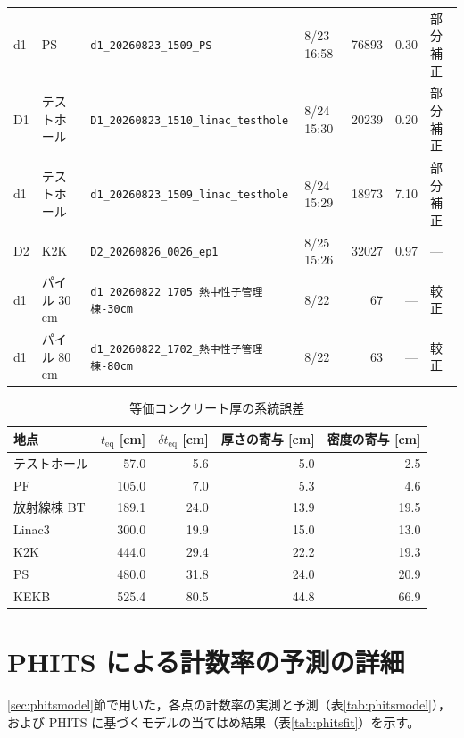 \documentclass[a4paper,11pt]{ltjsarticle}
\newcommand{\teq}{t_{\mathrm{eq}}}
\begin{document}
\begin{table}[htbp]
\begin{tabular}{llllrrl}
    d1 & PS & \texttt{d1\_20260823\_1509\_PS} & 8/23 16:58 & 76893 & 0.30 & 部分補正 \\
    D1 & テストホール & \texttt{D1\_20260823\_1510\_linac\_testhole} & 8/24 15:30 & 20239 & 0.20 & 部分補正 \\
    d1 & テストホール & \texttt{d1\_20260823\_1509\_linac\_testhole} & 8/24 15:29 & 18973 & 7.10 & 部分補正 \\
    D2 & K2K & \texttt{D2\_20260826\_0026\_ep1} & 8/25 15:26 & 32027 & 0.97 & --- \\
    \midrule
    d1 & パイル 30\,cm & \texttt{d1\_20260822\_1705\_熱中性子管理棟-30cm} & 8/22 & 67 & --- & 較正 \\
    d1 & パイル 80\,cm & \texttt{d1\_20260822\_1702\_熱中性子管理棟-80cm} & 8/22 & 63 & --- & 較正 \\
    \bottomrule
  \end{tabular}
\end{table}

\begin{table}[htbp]
  \centering
  \caption{等価コンクリート厚の系統誤差}
  \label{tab:teqerr}
  \begin{tabular}{lrrrr}
    \toprule
    地点 & $\teq$ [cm] & $\delta\teq$ [cm] & 厚さの寄与 [cm] & 密度の寄与 [cm] \\
    \midrule
    テストホール & 57.0 & 5.6 & 5.0 & 2.5 \\
    PF & 105.0 & 7.0 & 5.3 & 4.6 \\
    放射線棟 BT & 189.1 & 24.0 & 13.9 & 19.5 \\
    Linac3 & 300.0 & 19.9 & 15.0 & 13.0 \\
    K2K & 444.0 & 29.4 & 22.2 & 19.3 \\
    PS & 480.0 & 31.8 & 24.0 & 20.9 \\
    KEKB & 525.4 & 80.5 & 44.8 & 66.9 \\
    \bottomrule
  \end{tabular}
\end{table}

\section{PHITS による計数率の予測の詳細}
\label{app:phits}

\ref{sec:phitsmodel}節で用いた，各点の計数率の実測と予測（表\ref{tab:phitsmodel}），および PHITS に基づくモデルの当てはめ結果（表\ref{tab:phitsfit}）を示す。
\end{document}

